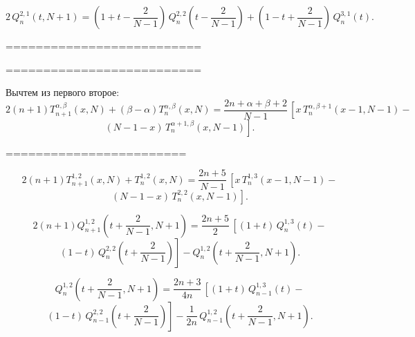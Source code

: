 \documentclass[12pt]{book}
\begin{document}
\begin{equation*}
  2\, Q^{2,1}_{n}\left(t,N+1\right) =
  \left(1+t-\frac{2}{N-1}\right)\,Q^{2,2}_{n}\left(t-\frac{2}{N-1}\right) + \left(1-t+\frac{2}{N-1}\right)\,Q^{3,1}_{n}(t).
\end{equation*}



==========================








\newpage
\newpage



==========================

Вычтем из первого второе:
\begin{equation*}
  2(n+1) T^{\alpha,\beta}_{n+1}(x,N) + (\beta-\alpha)T^{\alpha,\beta}_{n}(x,N)
  = \frac{2n+\alpha+\beta+2}{N-1}\,\left[
  x\,T^{\alpha,\beta+1}_{n}(x-1,N-1)-
  \right.
\end{equation*}
\begin{equation*}
\left.
  (N-1-x)\,T^{\alpha+1,\beta}_{n}(x,N-1)
  \right].
\end{equation*}


========================


\begin{equation*}
  2(n+1) T^{1,2}_{n+1}(x,N) + T^{1,2}_{n}(x,N)
  = \frac{2n+5}{N-1}\,\left[
  x\,T^{1,3}_{n}(x-1,N-1)-
  \right.
\end{equation*}
\begin{equation*}
\left.
  (N-1-x)\,T^{2,2}_{n}(x,N-1)
  \right].
\end{equation*}

\begin{equation*}
  2(n+1) Q^{1,2}_{n+1}\left(t+\frac{2}{N-1},N+1\right)
   =
  \frac{2n+5}{2}\,
  \left[
    (1+t)\,Q^{1,3}_{n}(t)-
  \right.
\end{equation*}
\begin{equation*}
\left.
  (1-t)\,Q^{2,2}_{n}\left(t+\frac{2}{N-1}\right)
  \right]
  - Q^{1,2}_{n}\left(t+\frac{2}{N-1},N+1\right).
\end{equation*}


\begin{equation*}
  Q^{1,2}_{n}\left(t+\frac{2}{N-1},N+1\right)
   =
  \frac{2n+3}{4n}\,
  \left[
    (1+t)\,Q^{1,3}_{n-1}(t)-
  \right.
\end{equation*}
\begin{equation*}
\left.
  (1-t)\,Q^{2,2}_{n-1}\left(t+\frac{2}{N-1}\right)
  \right]
  - \frac{1}{2n}\, Q^{1,2}_{n-1}\left(t+\frac{2}{N-1},N+1\right).
\end{equation*}
\end{document}
